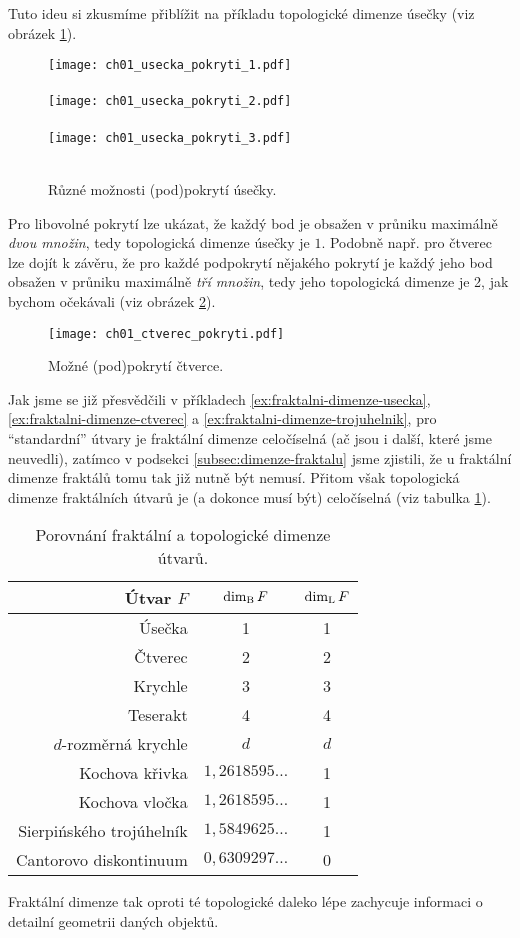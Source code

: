 Tuto ideu si zkusmíme přiblížit na příkladu topologické dimenze úsečky (viz obrázek \ref{fig:usecka-podpokryti}).
\begin{figure}[h]
    \centering
    \texttt{[image: ch01\_usecka\_pokryti\_1.pdf]}\\\qquad\\
    \texttt{[image: ch01\_usecka\_pokryti\_2.pdf]}\\\qquad\\
    \texttt{[image: ch01\_usecka\_pokryti\_3.pdf]}\\\qquad\\
    \caption{Různé možnosti (pod)pokrytí úsečky.}
    \label{fig:usecka-podpokryti}
\end{figure}
Pro libovolné pokrytí lze ukázat, že každý bod je obsažen v průniku maximálně \emph{dvou množin}, tedy topologická dimenze úsečky je $1$. Podobně např. pro čtverec lze dojít k závěru, že pro každé podpokrytí nějakého pokrytí je každý jeho bod obsažen v průniku maximálně \emph{tří množin}, tedy jeho topologická dimenze je 2, jak bychom očekávali (viz obrázek \ref{fig:ctverec-podpokryti}).
\begin{figure}[h]
    \centering
    \texttt{[image: ch01\_ctverec\_pokryti.pdf]}
    \caption{Možné (pod)pokrytí čtverce.}
    \label{fig:ctverec-podpokryti}
\end{figure}
Jak jsme se již přesvědčili v příkladech \ref{ex:fraktalni-dimenze-usecka}, \ref{ex:fraktalni-dimenze-ctverec} a \ref{ex:fraktalni-dimenze-trojuhelnik}, pro ``standardní'' útvary je fraktální dimenze celočíselná (ač jsou i další, které jsme neuvedli), zatímco v podsekci \ref{subsec:dimenze-fraktalu} jsme zjistili, že u fraktální dimenze fraktálů tomu tak již nutně být nemusí. Přitom však topologická dimenze fraktálních útvarů je (a dokonce musí být) celočíselná (viz tabulka \ref{table:fraktalni-topologicka-dimenze}).
\begin{table}[h]
    \centering
    \begin{tabular}{r|cc}
    Útvar $F$                & $\operatorname{dim_B}{F}$            & $\operatorname{dim_L}{F}$ \\\hline
    Úsečka                   & 1                     & 1          \\
    Čtverec                  & 2                     & 2          \\
    Krychle                  & 3                     & 3          \\
    Teserakt                 & 4                     & 4          \\
    $d$-rozměrná krychle     & $d$                   & $d$        \\
    Kochova křivka           & $1{,}2618595\dots$    & 1          \\
    Kochova vločka           & $1{,}2618595\dots$    & 1          \\
    Sierpińského trojúhelník & $1{,}5849625\dots$    & 1          \\
    Cantorovo diskontinuum   & $0{,}6309297\dots$    & 0      
    \end{tabular}
    \caption{Porovnání fraktální a topologické dimenze útvarů.}
    \label{table:fraktalni-topologicka-dimenze}
\end{table}
Fraktální dimenze tak oproti té topologické daleko lépe zachycuje informaci o detailní geometrii daných objektů.